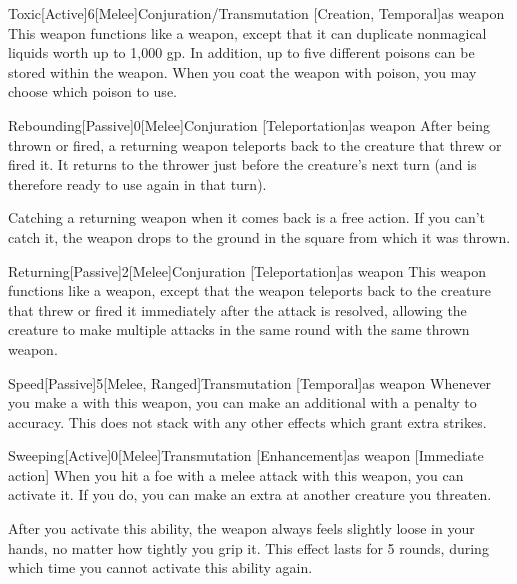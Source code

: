         \begin{magicitemdef}{Toxic}[Active]{6}[Melee]{Conjuration/Transmutation [Creation, Temporal]}{as weapon}
             This weapon functions like a  weapon, except that it can duplicate nonmagical liquids worth up to 1,000 gp.
            In addition, up to five different poisons can be stored within the weapon.
            When you coat the weapon with poison, you may choose which poison to use.
        \end{magicitemdef}

        \begin{magicitemdef}{Rebounding}[Passive]{0}[Melee]{Conjuration [Teleportation]}{as weapon}
             After being thrown or fired, a returning weapon teleports back to the creature that threw or fired it.
            It returns to the thrower just before the creature's next turn (and is therefore ready to use again in that turn).

            Catching a returning weapon when it comes back is a free action.
            If you can't catch it, the weapon drops to the ground in the square from which it was thrown.
        \end{magicitemdef}

        \begin{magicitemdef}{Returning}[Passive]{2}[Melee]{Conjuration [Teleportation]}{as weapon}
             This weapon functions like a  weapon, except that the weapon teleports back to the creature that threw or fired it immediately after the attack is resolved, allowing the creature to make multiple attacks in the same round with the same thrown weapon.
        \end{magicitemdef}

        \begin{magicitemdef}{Speed}[Passive]{5}[Melee, Ranged]{Transmutation [Temporal]}{as weapon}
             Whenever you make a  with this weapon, you can make an additional  with a  penalty to accuracy.
            This does not stack with any other effects which grant extra strikes.
        \end{magicitemdef}

        \begin{magicitemdef}{Sweeping}[Active]{0}[Melee]{Transmutation [Enhancement]}{as weapon}
            [Immediate action] When you hit a foe with a melee attack with this weapon, you can activate it.
            If you do, you can make an extra  at another creature you threaten.

            After you activate this ability, the weapon always feels slightly loose in your hands, no matter how tightly you grip it.
            This effect lasts for 5 rounds, during which time you cannot activate this ability again.
        \end{magicitemdef}

